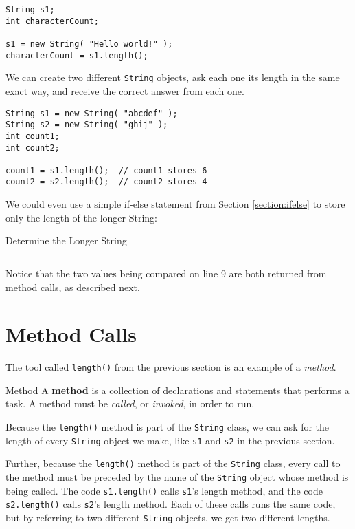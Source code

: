 \begin{verbatim}
String s1;
int characterCount;

s1 = new String( "Hello world!" );
characterCount = s1.length();
\end{verbatim}

We can create two different \texttt{String} objects, ask each one its length in the same exact way, and receive the correct answer from each one.

\begin{verbatim}
String s1 = new String( "abcdef" );
String s2 = new String( "ghij" );
int count1;
int count2;

count1 = s1.length();  // count1 stores 6
count2 = s2.length();  // count2 stores 4
\end{verbatim}

We could even use a simple if-else statement from Section \ref{section:ifelse} to store only the length of the longer String:

%

\begin{listing}[H]
\caption{Determine the Longer String}
\inputminted{java}{code/LongerString.java}
\label{code:longerstring}
\end{listing}

Notice that the two values being compared on line 9 are both returned from method calls, as described next.

\section{Method Calls}
\label{section:method-calls}
The tool called \texttt{length()} from the previous section is an example of a \textit{method}.

\begin{defn}{Method}
A \textbf{method} is a collection of declarations and statements that performs a task.  A method must be \textit{called}, or \textit{invoked}, in order to run.
\end{defn}

Because the \texttt{length()} method is part of the \texttt{String} class, we can ask for the length of every \texttt{String} object we make, like \texttt{s1} and \texttt{s2} in the previous section.

Further, because the \texttt{length()} method is part of the \texttt{String} class, every call to the method must be preceded by the name of the \texttt{String} object whose method is being called.  The code \texttt{s1.length()} calls \texttt{s1}'s length method, and the code \texttt{s2.length()} calls \texttt{s2}'s length method.  Each of these calls runs the same code, but by referring to two different \texttt{String} objects, we get two different lengths.

